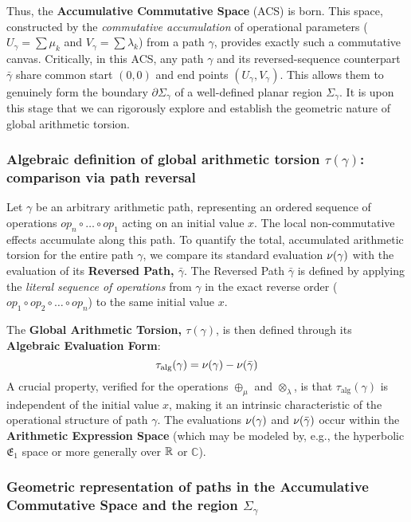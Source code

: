 Thus, the \textbf{Accumulative Commutative Space} (ACS) is born. This space, constructed by the \textit{commutative accumulation} of operational parameters ($U_\gamma = \sum \mu_k$ and $V_\gamma = \sum \lambda_k$) from a path $\gamma$, provides exactly such a commutative canvas. Critically, in this ACS, any path $\gamma$ and its reversed-sequence counterpart $\bar{\gamma}$ share common start $(0,0)$ and end points $(U_\gamma, V_\gamma)$. This allows them to genuinely form the boundary $\partial\Sigma_\gamma$ of a well-defined planar region $\Sigma_\gamma$. It is upon this stage that we can rigorously explore and establish the geometric nature of global arithmetic torsion.

\subsubsection*{Algebraic definition of global arithmetic torsion $\tau(\gamma)$: comparison via path reversal}

Let $\gamma$ be an arbitrary arithmetic path, representing an ordered sequence of operations $op_n \circ \dots \circ op_1$ acting on an initial value $x$. The local non-commutative effects accumulate along this path. To quantify the total, accumulated arithmetic torsion for the entire path $\gamma$, we compare its standard evaluation $\nu(\gamma)$ with the evaluation of its \textbf{Reversed Path, $\bar{\gamma}$}. The Reversed Path $\bar{\gamma}$ is defined by applying the \textit{literal sequence of operations} from $\gamma$ in the exact reverse order ($op_1 \circ op_2 \circ \dots \circ op_n$) to the same initial value $x$.

The \textbf{Global Arithmetic Torsion, $\tau(\gamma)$}, is then defined through its \textbf{Algebraic Evaluation Form}:
\begin{equation}
\tau_{\text{alg}}(\gamma) = \nu(\gamma) - \nu(\bar{\gamma})
\label{eq:T_alg_formal_final_narrative_enhanced_acs}
\end{equation}
A crucial property, verified for the operations $\oplus_\mu$ and $\otimes_\lambda$, is that $\tau_{\text{alg}}(\gamma)$ is independent of the initial value $x$, making it an intrinsic characteristic of the operational structure of path $\gamma$. The evaluations $\nu(\gamma)$ and $\nu(\bar{\gamma})$ occur within the \textbf{Arithmetic Expression Space} (which may be modeled by, e.g., the hyperbolic $\mathfrak{E}_1$ space or more generally over $\mathbb{R}$ or $\mathbb{C}$).

\subsubsection*{Geometric representation of paths in the Accumulative Commutative Space and the region $\Sigma_\gamma$}

